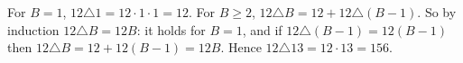 For $B=1$, $12\triangle1=12\cdot1\cdot1=12$. For $B\ge2$, $12\triangle B=12+12\triangle(B-1)$. So by induction $12\triangle B=12B$: it holds for $B=1$, and if $12\triangle(B-1)=12(B-1)$ then $12\triangle B=12+12(B-1)=12B$. Hence $12\triangle13=12\cdot13=\boxed{156}$.

